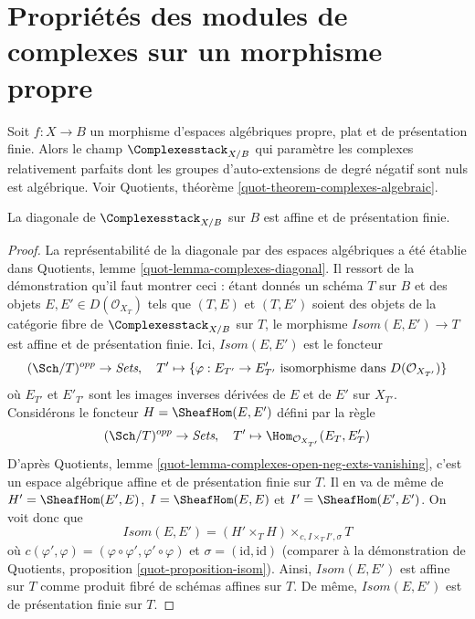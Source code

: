\section{Propriétés des modules de complexes sur un morphisme propre}
\label{section-complexes}

\noindent
Soit $f : X \to B$ un morphisme d'espaces algébriques propre, plat et de
présentation finie. Alors le champ $\Complexesstack_{X/B}$ qui paramètre
les complexes relativement parfaits dont les groupes d'auto-extensions de
degré négatif sont nuls est algébrique. Voir Quotients, théorème
\ref{quot-theorem-complexes-algebraic}.

\begin{lemma}
\label{lemma-complexes-diagonal-affine-fp}
La diagonale de $\Complexesstack_{X/B}$ sur $B$ est affine et de
présentation finie.
\end{lemma}

\begin{proof}
La représentabilité de la diagonale par des espaces algébriques a été
établie dans Quotients, lemme \ref{quot-lemma-complexes-diagonal}.
Il ressort de la démonstration qu'il faut montrer ceci : étant donnés un
schéma $T$ sur $B$ et des objets $E, E' \in D(\mathcal{O}_{X_T})$ tels que
$(T, E)$ et $(T, E')$ soient des objets de la catégorie fibre de
$\Complexesstack_{X/B}$ sur $T$, le morphisme
$\mathit{Isom}(E, E') \to T$ est affine et de présentation finie.
Ici, $\mathit{Isom}(E, E')$ est le foncteur
$$
(\Sch/T)^{opp} \to \textit{Sets},\quad
T' \mapsto \{\varphi : E_{T'} \to E'_{T'}
\text{ isomorphisme dans }D(\mathcal{O}_{X_{T'}})\}
$$
où $E_{T'}$ et $E'_{T'}$ sont les images inverses dérivées de $E$ et de
$E'$ sur $X_{T'}$. Considérons le foncteur
$H = \SheafHom(E, E')$ défini par la règle
$$
(\Sch/T)^{opp} \to \textit{Sets},\quad
T' \mapsto \Hom_{\mathcal{O}_{X_{T'}}}(E_T, E'_T)
$$
D'après Quotients, lemme
\ref{quot-lemma-complexes-open-neg-exts-vanishing}, c'est un espace
algébrique affine et de présentation finie sur $T$.
Il en va de même de $H' = \SheafHom(E', E)$,
$I = \SheafHom(E, E)$ et $I' = \SheafHom(E', E')$.
On voit donc que
$$
\mathit{Isom}(E, E') = (H' \times_T H) \times_{c, I \times_T I', \sigma} T
$$
où $c(\varphi', \varphi) =
(\varphi \circ \varphi', \varphi' \circ \varphi)$ et
$\sigma = (\text{id}, \text{id})$ (comparer à la démonstration de
Quotients, proposition \ref{quot-proposition-isom}).
Ainsi, $\mathit{Isom}(E, E')$ est affine sur $T$ comme produit fibré de
schémas affines sur $T$. De même, $\mathit{Isom}(E, E')$ est de
présentation finie sur $T$.
\end{proof}

